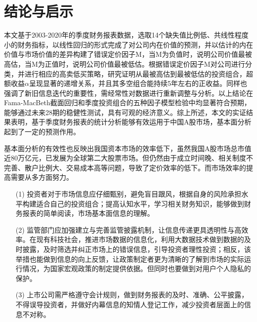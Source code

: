 
\chapter{结论与启示}
本文基于2003-2020年的季度财务报表数据，选取14个缺失值比例低、共线性程度小的财务指标，以线性回归的形式完成了对公司内在价值的预测，并以估计的内在价值与市场价值的差异构建了错误定价因子M，当M为负值时，说明公司价值最被高估，当M为正值时，说明公司价值最被低估。根据错误定价因子M对公司进行分类，并进行相应的高卖低买策略，研究证明从最被高估到最被低估的投资组合，超额收益$\alpha$呈现显著的递增关系，并且其多空组合能持续5年左右的正收益。同样也强调了新旧信息迭代的重要性，需经常性对数据进行重新调整与分析。以上结论在Fama-MacBeth截面回归和季度投资组合的五种因子模型检验中均显著符合预期，能够通过未来28期的稳健性测试，具有可观的经济意义。综上所述，本文的实证结果表明，基于季度财务报表的统计分析能够有效运用于中国A股市场，基本面分析起到了一定的预测作用。

基本面分析的有效性也反映出我国资本市场的效率低下，虽然我国A股市场总市值近80万亿元，已发展为全球第二大股票市场。但仍然由于成立时间晚、相关制度不完善、散户比例大、交易成本高等问题，导致了定价效率的低下。而市场效率的提高需要从多方面努力。
\begin{itemize}
\item[(1)] 投资者对于市场信息应仔细甄别，避免盲目跟风，根据自身的风险承担水平构建适合自己的投资组合；提高认知水平，学习相关财务知识，能够做到财务报表的简单阅读，市场基本面信息的理解。

\item[(2)] 监管部门应加强建立与完善监管披露机制，让信息传递更具透明性与高效率。在现有科技社会，推进市场数据的信息化，利用大数据技术做到数据的及时披露，及时筛选并纠正市场上的错误信息，引导投资者理性投资；相反，该举措也能做到信息的向上反馈，让政策制定者更为清晰的了解到市场的实际运行情况，为国家宏观政策的制定提供依据。但同时也要做到对用户个人隐私的保护。

\item[(3)] 上市公司需严格遵守会计规则，做到财务报表的及时、准确、公平披露，不得误导投资者，并做好内幕信息的知情人登记工作，减少投资者层面上的信息不对称。


\end{itemize}



